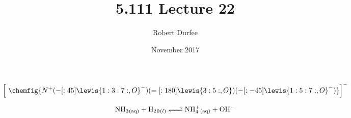 \documentclass{article}
\title{5.111 Lecture 22}
\author{Robert Durfee}
\date{November 2017}
\begin{document}
\maketitle

$$ \left[\ \chemfig{ N^{+} ( -[:45] \lewis{1:3:7:,O}^{-}) ( =[:180]
\lewis{3:5:,O}) ( -[:-45] \lewis{1:5:7:,O}^{-})} \right]^{-} $$

$$ \ce{ NH_{3}_{( aq )} + H_{2}0_{( l )} <=> NH^{+}_{4}_{( aq )} + OH- } $$
\end{document}
